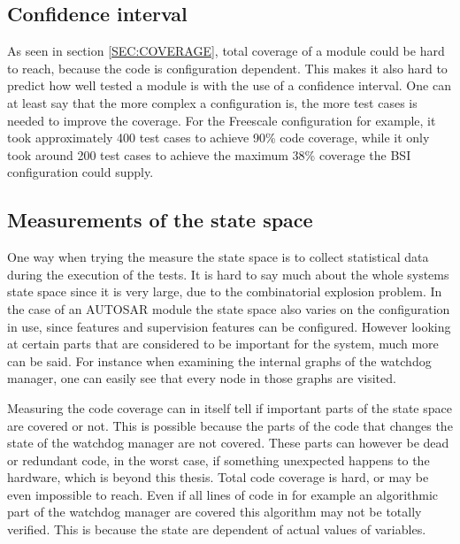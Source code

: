 \subsection{Confidence interval}
As seen in section \ref{SEC:COVERAGE}, total coverage of a module
could be hard to reach, because the code is configuration
dependent. This makes it also hard to predict how well tested a module
is with the use of a confidence interval. One can at least say that
the more complex a configuration is, the more test cases is needed to
improve the coverage. For the Freescale configuration for example, it
took approximately 400 test cases to achieve 90\% code coverage, while
it only took around 200 test cases to achieve the maximum 38\%
coverage the BSI configuration could supply.

\subsection{Measurements of the state space}
One way when trying the measure the state space is to collect
statistical data during the execution of the tests. It is hard to say
much about the whole systems state space since it is very large, due
to the combinatorial explosion problem. In the case of an AUTOSAR module the
state space also varies on the configuration in use, since features
and supervision features can be configured.  However looking at
certain parts that are considered to be important for the system, much
more can be said. For instance when examining the internal graphs of
the watchdog manager, one can easily see that every node in those
graphs are visited.

Measuring the code coverage can in itself tell if important parts of
the state space are covered or not. This is possible because the parts
of the code that changes the state of the watchdog manager are not
covered. These parts can however be dead or redundant code, in the
worst case, if something unexpected happens to the hardware, which is
beyond this thesis. Total code coverage is hard, or may be even
impossible to reach.  Even if all lines of code in for example an
algorithmic part of the watchdog manager are covered this algorithm
may not be totally verified. This is because the state are dependent
of actual values of variables.
